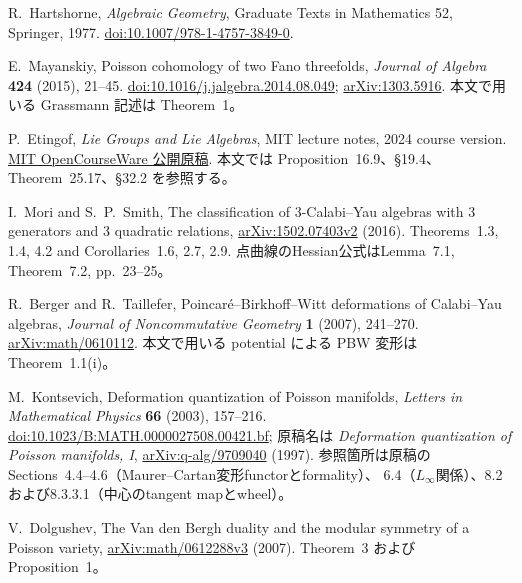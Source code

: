 R.~Hartshorne,
\emph{Algebraic Geometry}, Graduate Texts in Mathematics 52,
Springer, 1977.
\href{https://doi.org/10.1007/978-1-4757-3849-0}{doi:10.1007/978-1-4757-3849-0}.

E.~Mayanskiy,
Poisson cohomology of two Fano threefolds,
\emph{Journal of Algebra} \textbf{424} (2015), 21--45.
\href{https://doi.org/10.1016/j.jalgebra.2014.08.049}{doi:10.1016/j.jalgebra.2014.08.049};
\href{https://arxiv.org/abs/1303.5916}{arXiv:1303.5916}.
本文で用いる Grassmann 記述は Theorem~1。

P.~Etingof,
\emph{Lie Groups and Lie Algebras}, MIT lecture notes, 2024 course version.
\href{https://live.ocw.mit.edu/courses/18-755-lie-groups-and-lie-algebras-ii-spring-2024/mit18_755_s24_lec_full.pdf}{MIT OpenCourseWare 公開原稿}.
本文では Proposition~16.9、\S19.4、Theorem~25.17、\S32.2 を参照する。

I.~Mori and S.~P.~Smith,
The classification of 3-Calabi--Yau algebras with 3 generators and 3 quadratic relations,
\href{https://arxiv.org/abs/1502.07403v2}{arXiv:1502.07403v2} (2016).
Theorems~1.3, 1.4, 4.2 and Corollaries~1.6, 2.7, 2.9.
点曲線のHessian公式はLemma~7.1, Theorem~7.2, pp.~23--25。

R.~Berger and R.~Taillefer,
Poincar\'e--Birkhoff--Witt deformations of Calabi--Yau algebras,
\emph{Journal of Noncommutative Geometry} \textbf{1} (2007), 241--270.
\href{https://arxiv.org/abs/math/0610112}{arXiv:math/0610112}.
本文で用いる potential による PBW 変形は Theorem~1.1(i)。

M.~Kontsevich,
Deformation quantization of Poisson manifolds,
\emph{Letters in Mathematical Physics} \textbf{66} (2003), 157--216.
\href{https://doi.org/10.1023/B:MATH.0000027508.00421.bf}{doi:10.1023/B:MATH.0000027508.00421.bf};
原稿名は \emph{Deformation quantization of Poisson manifolds, I},
\href{https://arxiv.org/abs/q-alg/9709040}{arXiv:q-alg/9709040} (1997).
参照箇所は原稿のSections~4.4--4.6（Maurer--Cartan変形functorとformality）、
6.4（$L_\infty$関係）、8.2および8.3.3.1（中心のtangent mapとwheel）。

V.~Dolgushev,
The Van den Bergh duality and the modular symmetry of a Poisson variety,
\href{https://arxiv.org/abs/math/0612288v3}{arXiv:math/0612288v3} (2007).
Theorem~3 および Proposition~1。
